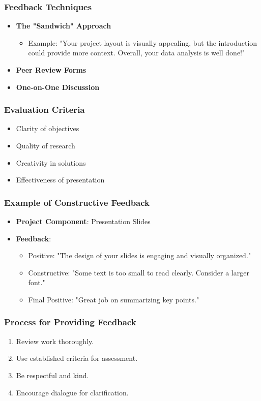 \documentclass[aspectratio=169]{beamer}
\begin{document}
\begin{frame}[fragile]
    \frametitle{Feedback Techniques}
    \begin{itemize}
        \item \textbf{The "Sandwich" Approach}
            \begin{itemize}
                \item Example: "Your project layout is visually appealing, but the introduction could provide more context. Overall, your data analysis is well done!"
            \end{itemize}
        \item \textbf{Peer Review Forms}
        \item \textbf{One-on-One Discussion}
    \end{itemize}
\end{frame}

\begin{frame}[fragile]
    \frametitle{Evaluation Criteria}
    \begin{itemize}
        \item Clarity of objectives
        \item Quality of research
        \item Creativity in solutions
        \item Effectiveness of presentation
    \end{itemize}
\end{frame}

\begin{frame}[fragile]
    \frametitle{Example of Constructive Feedback}
    \begin{itemize}
        \item \textbf{Project Component}: Presentation Slides
        \item \textbf{Feedback}:
            \begin{itemize}
                \item Positive: "The design of your slides is engaging and visually organized."
                \item Constructive: "Some text is too small to read clearly. Consider a larger font."
                \item Final Positive: "Great job on summarizing key points."
            \end{itemize}
    \end{itemize}
\end{frame}

\begin{frame}[fragile]
    \frametitle{Process for Providing Feedback}
    \begin{enumerate}
        \item Review work thoroughly.
        \item Use established criteria for assessment.
        \item Be respectful and kind.
        \item Encourage dialogue for clarification.
    \end{enumerate}
\end{frame}
\end{document}
